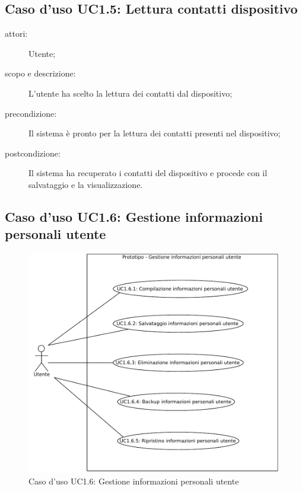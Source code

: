 \subsection{Caso d'uso UC1.5: Lettura contatti dispositivo}
\begin{description}
\item[attori:] Utente;
\item[scopo e descrizione:] L'utente ha scelto la lettura dei contatti dal dispositivo;
\item[precondizione:] Il sistema è pronto per la lettura dei contatti presenti nel dispositivo;
\item[postcondizione:] Il sistema ha recuperato i contatti del dispositivo e procede con il salvataggio e la visualizzazione.
\end{description}

\subsection{Caso d'uso UC1.6: Gestione informazioni personali utente}
\begin{figure}[htb]
\centering
\includegraphics[scale=0.6]{gfx/useCase/UC1-6_Gestione_informazioni_personali_utente.pdf}
\caption{Caso d'uso UC1.6: Gestione informazioni personali utente}
\label{fig:UC1.6}
\end{figure}

